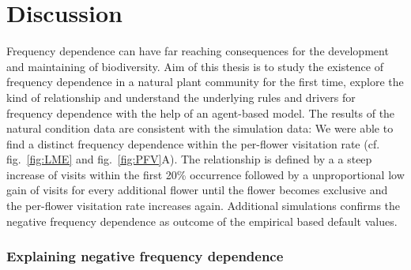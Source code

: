 \label{ch:discussion}
%
%



\section{Discussion}

Frequency dependence can have far reaching consequences for the development and maintaining of biodiversity. Aim of this thesis is to study the existence of frequency dependence in a natural plant community for the first time, explore the kind of relationship and understand the underlying rules and drivers for frequency dependence with the help of an agent-based model.
The results of the natural condition data are consistent with the simulation data: We were able to find a distinct frequency dependence within the per-flower visitation rate (cf. fig.~\ref{fig:LME} and fig.~\ref{fig:PFV}A). The relationship is defined by a a steep increase of visits within the first 20\% occurrence followed by a unproportional low gain of visits for every additional flower until the flower becomes exclusive and the per-flower visitation rate increases again. Additional simulations confirms the negative frequency dependence as outcome of the empirical based default values.\\

\subsubsection*{Explaining negative frequency dependence}

